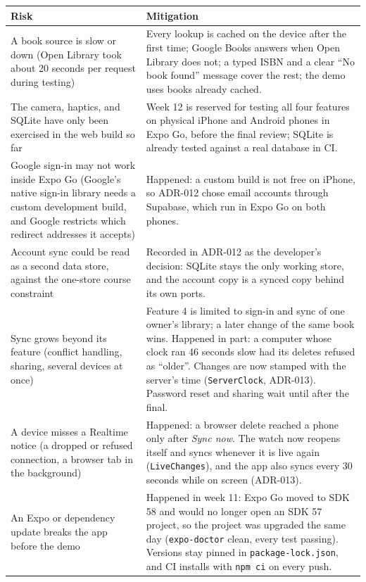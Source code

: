 \documentclass[12pt]{article}
\begin{document}
\medskip
\noindent
\begin{longtable}{|L{4.6cm}|L{10cm}|}
\hline
\textbf{Risk} & \textbf{Mitigation} \\
\hline
\endhead
A book source is slow or down (Open Library took about 20 seconds per request during testing) & Every lookup is cached on the device after the first time; Google Books answers when Open Library does not; a typed ISBN and a clear ``No book found'' message cover the rest; the demo uses books already cached. \\
\hline
The camera, haptics, and SQLite have only been exercised in the web build so far & Week 12 is reserved for testing all four features on physical iPhone and Android phones in Expo Go, before the final review; SQLite is already tested against a real database in CI. \\
\hline
Google sign-in may not work inside Expo Go (Google's native sign-in library needs a custom development build, and Google restricts which redirect addresses it accepts) & Happened: a custom build is not free on iPhone, so ADR-012 chose email accounts through Supabase, which run in Expo Go on both phones. \\
\hline
Account sync could be read as a second data store, against the one-store course constraint & Recorded in ADR-012 as the developer's decision: SQLite stays the only working store, and the account copy is a synced copy behind its own ports. \\
\hline
Sync grows beyond its feature (conflict handling, sharing, several devices at once) & Feature 4 is limited to sign-in and sync of one owner's library; a later change of the same book wins. Happened in part: a computer whose clock ran 46 seconds slow had its deletes refused as ``older''. Changes are now stamped with the server's time (\texttt{ServerClock}, ADR-013). Password reset and sharing wait until after the final. \\
\hline
A device misses a Realtime notice (a dropped or refused connection, a browser tab in the background) & Happened: a browser delete reached a phone only after \emph{Sync now}. The watch now reopens itself and syncs whenever it is live again (\texttt{LiveChanges}), and the app also syncs every 30 seconds while on screen (ADR-013). \\
\hline
An Expo or dependency update breaks the app before the demo & Happened in week 11: Expo Go moved to SDK 58 and would no longer open an SDK 57 project, so the project was upgraded the same day (\texttt{expo-doctor} clean, every test passing). Versions stay pinned in \texttt{package-lock.json}, and CI installs with \texttt{npm ci} on every push. \\

\end{longtable}
\end{document}
